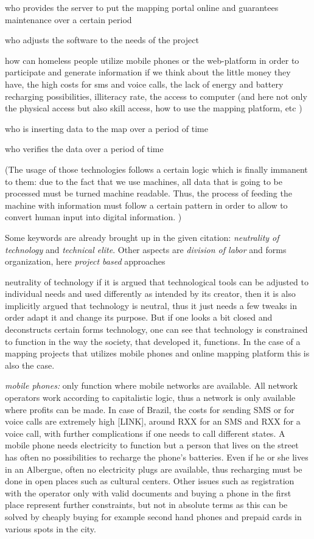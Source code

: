 

\item who provides the server to put the mapping portal online and guarantees maintenance over a certain period
\item who adjusts the software to the needs of the project
\item how can homeless people utilize mobile phones or the web-platform in order to participate and generate information if we think about the little money they have, the high costs for sms and voice calls, the lack of energy and battery recharging possibilities, illiteracy rate, the access to computer (and here not only the physical access but also skill access, how to use the mapping platform, etc )
\item who is inserting data to the map over a period of time
\item who verifies the data over a period of time


(The usage of those technologies follows a certain logic which is finally immanent to them: due to the fact that we use machines, all data that is going to be processed must be turned machine readable. Thus, the process of feeding the machine with information must follow a certain pattern in order to allow to convert human input into digital information. )

Some keywords are already brought up in the given citation: {\em neutrality of technology} and {\em technical elite}. Other aspects are {\em division of labor} and forms organization, here {\em project based} approaches

{\bold neutrality of technology} if it is argued that technological tools can be adjusted to individual needs and used differently as intended by its creator, then it is also implicitly argued that technology is neutral, thus it just needs a few tweaks in order adapt it and change its purpose. But if one looks a bit closed and deconstructs certain forms technology, one can see that technology is constrained to function in the way the society, that developed it, functions. In the case of a mapping projects that utilizes mobile phones and online mapping platform this is also the case. 

{\em mobile phones:} only function where mobile networks are available. All network operators work according to capitalistic logic, thus a network is only available where profits can be made. In case of Brazil, the costs for sending SMS or for voice calls are extremely high [LINK], around RXX for an SMS and RXX for a voice call, with further complications if one needs to call different states. A mobile phone needs electricity to function but a person that lives on the street has often no possibilities to recharge the phone's batteries. Even if he or she lives in an Albergue, often no electricity plugs are available, thus recharging must be done in open places such as cultural centers. Other issues such as registration with the operator only with valid documents and buying a phone in the first place represent further constraints, but not in absolute terms as this can be solved by cheaply buying for example second hand phones and prepaid cards in various spots in the city.

